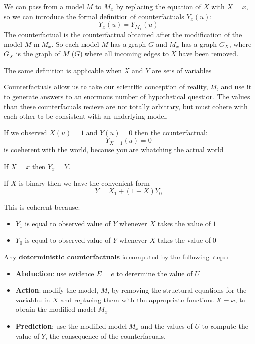 We can pass from a model $M$ to $M_x$ by replacing the equation of $X$ with $X=x$,
so we can introduce the formal definition of counterfactuals $Y_x (u)$:
$$Y_x (u) = Y_{M_x}(u)$$
The counterfactual is the counterfactual obtained after the modification of the model
$M$ in $M_x$. So each model $M$ has a graph $G$ and $M_x$ has a graph $G_X$, where
$G_X$ is the graph of $M$ ($G$) where all incoming edges to $X$ have been removed.

The same definition is applicable when $X$ and $Y$ are sets of variables.

Counterfactuals allow us to take our scientific conception of reality, $M$, and
use it to generate answers to an enormous number of hypothetical question.
The values than these counterfacuals recieve are not totally arbitrary, but must
cohere with each other to be consistent with an underlying model.

\begin{note}
    If we observed $X(u)=1$ and $Y(u) = 0$ then the counterfactual:
    $$Y_{X=1}(u)=0$$
    is coeherent with the world, because you are whatching the actual world
\end{note}

\begin{definition}
    If $X= x$ then $Y_x=Y$.

    If $X$ is binary then we have the convenient form
    $$Y = X_1 + (1-X)Y_0 $$
\end{definition}
This is coherent because:
\begin{itemize}
    \item $Y_1$ is equal to observed value of $Y$ whenever $X$ takes the value of $1$
    \item $Y_0$ is equal to observed value of $Y$ whenever $X$ takes the value of $0$
\end{itemize}

Any \textbf{deterministic counterfactuals} is computed by the following steps:
\begin{itemize}
    \item \textbf{Abduction}: use evidence $E = e$ to derermine the value of $U$
    \item \textbf{Action}: modify the model, $M$, by removing the structural equations for
          the variables in $X$ and replacing them with the appropriate functions $X = x$,
          to obrain the modified model $M_x$
    \item \textbf{Prediction}: use the modified model $M_x$ and the values of $U$ to compute
          the value of $Y$, the consequence of the counterfacuals.
\end{itemize}

